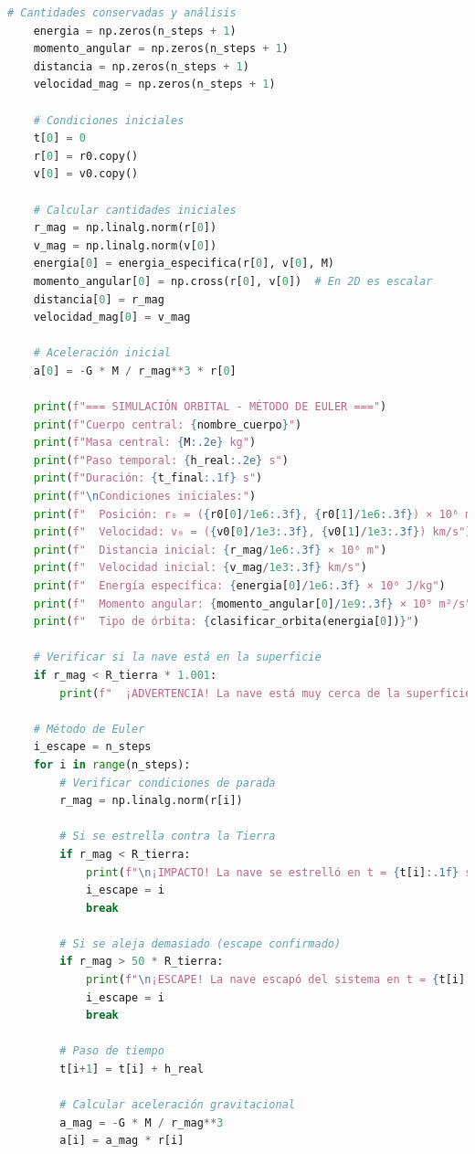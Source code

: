 \documentclass{article}
\begin{document}
\begin{lstlisting}[language=Python, caption={Análisis completo del sistema Tierra-nave}]
    # Cantidades conservadas y análisis
    energia = np.zeros(n_steps + 1)
    momento_angular = np.zeros(n_steps + 1)
    distancia = np.zeros(n_steps + 1)
    velocidad_mag = np.zeros(n_steps + 1)
    
    # Condiciones iniciales
    t[0] = 0
    r[0] = r0.copy()
    v[0] = v0.copy()
    
    # Calcular cantidades iniciales
    r_mag = np.linalg.norm(r[0])
    v_mag = np.linalg.norm(v[0])
    energia[0] = energia_especifica(r[0], v[0], M)
    momento_angular[0] = np.cross(r[0], v[0])  # En 2D es escalar
    distancia[0] = r_mag
    velocidad_mag[0] = v_mag
    
    # Aceleración inicial
    a[0] = -G * M / r_mag**3 * r[0]
    
    print(f"=== SIMULACIÓN ORBITAL - MÉTODO DE EULER ===")
    print(f"Cuerpo central: {nombre_cuerpo}")
    print(f"Masa central: {M:.2e} kg")
    print(f"Paso temporal: {h_real:.2e} s")
    print(f"Duración: {t_final:.1f} s")
    print(f"\nCondiciones iniciales:")
    print(f"  Posición: r₀ = ({r0[0]/1e6:.3f}, {r0[1]/1e6:.3f}) × 10⁶ m")
    print(f"  Velocidad: v₀ = ({v0[0]/1e3:.3f}, {v0[1]/1e3:.3f}) km/s")
    print(f"  Distancia inicial: {r_mag/1e6:.3f} × 10⁶ m")
    print(f"  Velocidad inicial: {v_mag/1e3:.3f} km/s")
    print(f"  Energía específica: {energia[0]/1e6:.3f} × 10⁶ J/kg")
    print(f"  Momento angular: {momento_angular[0]/1e9:.3f} × 10⁹ m²/s")
    print(f"  Tipo de órbita: {clasificar_orbita(energia[0])}")
    
    # Verificar si la nave está en la superficie
    if r_mag < R_tierra * 1.001:
        print(f"  ¡ADVERTENCIA! La nave está muy cerca de la superficie terrestre")
    
    # Método de Euler
    i_escape = n_steps
    for i in range(n_steps):
        # Verificar condiciones de parada
        r_mag = np.linalg.norm(r[i])
        
        # Si se estrella contra la Tierra
        if r_mag < R_tierra:
            print(f"\n¡IMPACTO! La nave se estrelló en t = {t[i]:.1f} s")
            i_escape = i
            break
            
        # Si se aleja demasiado (escape confirmado)
        if r_mag > 50 * R_tierra:
            print(f"\n¡ESCAPE! La nave escapó del sistema en t = {t[i]:.1f} s")
            i_escape = i
            break
        
        # Paso de tiempo
        t[i+1] = t[i] + h_real
        
        # Calcular aceleración gravitacional
        a_mag = -G * M / r_mag**3
        a[i] = a_mag * r[i]
        

\end{lstlisting}
\end{document}
